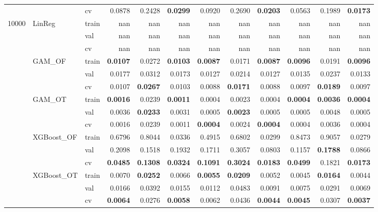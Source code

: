 \begin{tabular}{lllrrrrrrrrr}
 &  & cv & 0.0878 & 0.2428 & \bfseries 0.0299 & 0.0920 & 0.2690 & \bfseries 0.0203 & 0.0563 & 0.1989 & \bfseries 0.0173 \\
\multirow[c]{15}{*}{10000} & \multirow[c]{3}{*}{LinReg} & train & nan & nan & nan & nan & nan & nan & nan & nan & nan \\
 &  & val & nan & nan & nan & nan & nan & nan & nan & nan & nan \\
 &  & cv & nan & nan & nan & nan & nan & nan & nan & nan & nan \\
 & \multirow[c]{3}{*}{GAM_OF} & train & \bfseries 0.0107 & 0.0272 & \bfseries 0.0103 & \bfseries 0.0087 & 0.0171 & \bfseries 0.0087 & \bfseries 0.0096 & 0.0191 & \bfseries 0.0096 \\
 &  & val & 0.0177 & 0.0312 & 0.0173 & 0.0127 & 0.0214 & 0.0127 & 0.0135 & 0.0237 & 0.0133 \\
 &  & cv & 0.0107 & \bfseries 0.0267 & 0.0103 & 0.0088 & \bfseries 0.0171 & 0.0088 & 0.0097 & \bfseries 0.0189 & 0.0097 \\
 & \multirow[c]{3}{*}{GAM_OT} & train & \bfseries 0.0016 & 0.0239 & \bfseries 0.0011 & 0.0004 & 0.0023 & 0.0004 & \bfseries 0.0004 & \bfseries 0.0036 & \bfseries 0.0004 \\
 &  & val & 0.0036 & \bfseries 0.0233 & 0.0031 & 0.0005 & \bfseries 0.0023 & 0.0005 & 0.0005 & 0.0048 & 0.0005 \\
 &  & cv & 0.0016 & 0.0239 & 0.0011 & \bfseries 0.0004 & 0.0024 & \bfseries 0.0004 & 0.0004 & 0.0036 & 0.0004 \\
 & \multirow[c]{3}{*}{XGBoost_OF} & train & 0.6796 & 0.8044 & 0.0336 & 0.4915 & 0.6802 & 0.0299 & 0.8473 & 0.9057 & 0.0279 \\
 &  & val & 0.2098 & 0.1518 & 0.1932 & 0.1711 & 0.3057 & 0.0803 & 0.1157 & \bfseries 0.1788 & 0.0866 \\
 &  & cv & \bfseries 0.0485 & \bfseries 0.1308 & \bfseries 0.0324 & \bfseries 0.1091 & \bfseries 0.3024 & \bfseries 0.0183 & \bfseries 0.0499 & 0.1821 & \bfseries 0.0173 \\
 & \multirow[c]{3}{*}{XGBoost_OT} & train & 0.0070 & \bfseries 0.0252 & 0.0066 & \bfseries 0.0055 & \bfseries 0.0209 & 0.0052 & 0.0045 & \bfseries 0.0164 & 0.0044 \\
 &  & val & 0.0166 & 0.0392 & 0.0155 & 0.0112 & 0.0483 & 0.0091 & 0.0075 & 0.0291 & 0.0069 \\
 &  & cv & \bfseries 0.0064 & 0.0276 & \bfseries 0.0058 & 0.0062 & 0.0436 & \bfseries 0.0044 & \bfseries 0.0045 & 0.0307 & \bfseries 0.0037 \\
\end{tabular}

